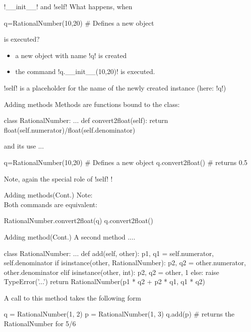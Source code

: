 \documentclass[hyperref={pdfpagelabels=false},table]{beamer}
\begin{document}
\begin{frame}[fragile]{\pyth!__init__! and \pyth!self!}
What happens, when
\begin{python}
q=RationalNumber(10,20)    # Defines a new object
\end{python}
is executed?
\vfill
\begin{itemize}
\item a new object with name \pyth!q! is created
\item the command \pyth!q.__init__(10,20)! is executed.
\end{itemize}
\vfill
\pyth!self! is a placeholder for the name of the newly created instance (here: \pyth!q!)
\vfill

\end{frame}
\begin{frame}[fragile]{Adding methods}
Methods are functions bound to the class:
\vfill
\begin{python}
class RationalNumber:
...
  def convert2float(self):
    return float(self.numerator)/float(self.denominator)
\end{python}
\vfill
and its use ...
\begin{python}
q=RationalNumber(10,20)    # Defines a new object
q.convert2float() # returns 0.5
\end{python}
\vfill
Note, again the special role of \pyth!self! !
\end{frame}
\begin{frame}[fragile]{Adding methods\hfill (Cont.)}
\vfill
Note: \\
Both commands are equivalent:
\begin{python}
RationalNumber.convert2float(q)
q.convert2float()
\end{python}
\vfill
\end{frame}
\begin{frame}[fragile]{Adding method\hfill(Cont.)}
A second method ....
\begin{python}
class RationalNumber:
...
  def add(self, other):
    p1, q1 = self.numerator, self.denominator
    if isinstance(other, RationalNumber):
      p2, q2 =  other.numerator, other.denominator
    elif isinstance(other, int):
      p2, q2 = other, 1
    else:
      raise TypeError('...')
    return RationalNumber(p1 * q2 + p2 * q1, q1 * q2)
\end{python}

A call to this method takes the following form

\begin{python}
q = RationalNumber(1, 2)
p = RationalNumber(1, 3)
q.add(p)   # returns the RationalNumber for 5/6
\end{python}

\end{frame}
\end{document}
